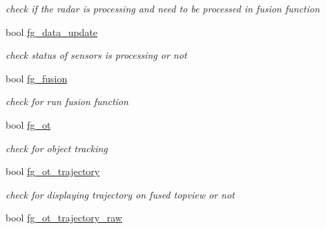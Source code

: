 \begin{DoxyCompactItemize}
\begin{DoxyCompactList}\small\item\em check if the radar is processing and need to be processed in fusion function \end{DoxyCompactList}\item 
\hypertarget{class_sensor_info_a20a40d7fe32d657e543cc241c6aa98ab}{}bool \hyperlink{class_sensor_info_a20a40d7fe32d657e543cc241c6aa98ab}{fg\+\_\+data\+\_\+update}\label{class_sensor_info_a20a40d7fe32d657e543cc241c6aa98ab}

\begin{DoxyCompactList}\small\item\em check status of sensors is processing or not \end{DoxyCompactList}\item 
\hypertarget{class_sensor_info_a231c2936351dc2325334f0988bde478c}{}bool \hyperlink{class_sensor_info_a231c2936351dc2325334f0988bde478c}{fg\+\_\+fusion}\label{class_sensor_info_a231c2936351dc2325334f0988bde478c}

\begin{DoxyCompactList}\small\item\em check for run fusion function \end{DoxyCompactList}\item 
\hypertarget{class_sensor_info_aeed9690aa611953f6ea450c63767b138}{}bool \hyperlink{class_sensor_info_aeed9690aa611953f6ea450c63767b138}{fg\+\_\+ot}\label{class_sensor_info_aeed9690aa611953f6ea450c63767b138}

\begin{DoxyCompactList}\small\item\em check for object tracking \end{DoxyCompactList}\item 
\hypertarget{class_sensor_info_a9317c7c2d9e06d47ba292e7784fd2b2d}{}bool \hyperlink{class_sensor_info_a9317c7c2d9e06d47ba292e7784fd2b2d}{fg\+\_\+ot\+\_\+trajectory}\label{class_sensor_info_a9317c7c2d9e06d47ba292e7784fd2b2d}

\begin{DoxyCompactList}\small\item\em check for displaying trajectory on fused topview or not \end{DoxyCompactList}\item 
\hypertarget{class_sensor_info_a4ce1e5a2e2568e32c48f3a8aaddd298c}{}bool \hyperlink{class_sensor_info_a4ce1e5a2e2568e32c48f3a8aaddd298c}{fg\+\_\+ot\+\_\+trajectory\+\_\+raw}\label{class_sensor_info_a4ce1e5a2e2568e32c48f3a8aaddd298c}


\end{DoxyCompactItemize}
